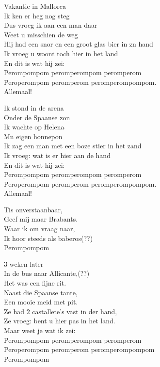 \clearpage
\begin{translation}[De Sjonies]
Vakantie in Mallorca\\
Ik ken er heg nog steg\\
Dus vroeg ik aan een man daar\\
Weet u misschien de weg\\
Hij had een snor en een groot glas bier in zn hand\\
Ik vroeg u woont toch hier in het land\\
En dit is wat hij zei:\\
Perompompom peromperompom peromperom\\
Peroperompom peromperom peromperompompom.\\
Allemaal!\vspace{\wlskip}

Ik stond in de arena\\
Onder de Spaanse zon\\
Ik wachte op Helena\\
Mn eigen honnepon\\
Ik zag een man met een boze stier in het zand\\
Ik vroeg: wat is er hier aan de hand\\
En dit is wat hij zei:\\
Perompompom peromperompom peromperom\\
Peroperompom peromperom peromperompompom.\\
Allemaal!\vspace{\wlskip}

Tis onverstaanbaar,\\ 
Geef mij maar Brabants.\\
Waar ik om vraag naar,\\
Ik hoor steeds als baberos(??)\\
Perompompom\vspace{\wlskip}

3 weken later\\
In de bus naar Allicante,(??)\\
Het was een fijne rit.\\
Naast die Spaanse tante,\\
Een mooie meid met pit.\\
Ze had 2 castallete's vast in der hand,\\
Ze vroeg: bent u hier pas in het land.\\
Maar weet je wat ik zei:\\
Perompompom peromperompom peromperom\\
Peroperompom peromperom peromperompompom\\
Perompompom 
\end{translation}

